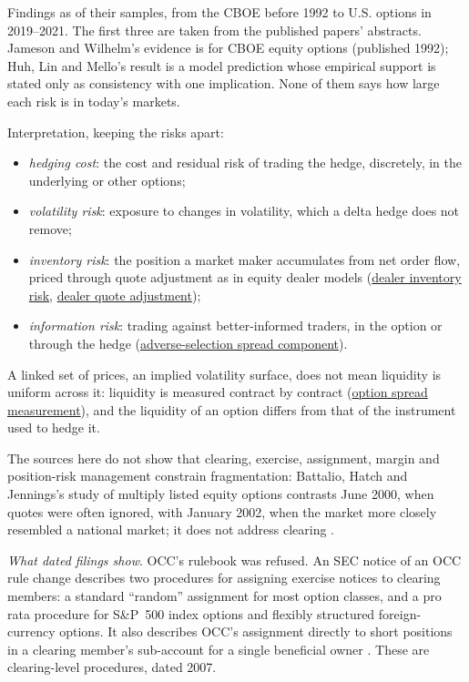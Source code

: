 \begin{qfresult}
 Findings as of their samples, from the CBOE before 1992 to U.S. options in 2019--2021. The first three are taken from the published papers' abstracts. Jameson and Wilhelm's evidence is for CBOE equity options (published 1992); Huh, Lin and Mello's result is a model prediction whose empirical support is stated only as consistency with one implication. None of them says how large each risk is in today's markets.

 Interpretation, keeping the risks apart:
\begin{itemize}
\item \emph{hedging cost}: the cost and residual risk of trading the hedge, discretely, in the underlying or other options;
\item \emph{volatility risk}: exposure to changes in volatility, which a delta hedge does not remove;
\item \emph{inventory risk}: the position a market maker accumulates from net order flow, priced through quote adjustment as in equity dealer models (\hyperref[def:dealer-inventory-risk]{dealer inventory risk}, \hyperref[meth:dealer-quote-adjustment]{dealer quote adjustment});
\item \emph{information risk}: trading against better-informed traders, in the option or through the hedge (\hyperref[res:adverse-selection-spread-component]{adverse-selection spread component}).
\end{itemize}
A linked set of prices, an implied volatility surface, does not mean liquidity is uniform across it: liquidity is measured contract by contract (\hyperref[meth:option-spread-measurement]{option spread measurement}), and the liquidity of an option differs from that of the instrument used to hedge it.

 The sources here do not show that clearing, exercise, assignment, margin and position-risk management constrain fragmentation: Battalio, Hatch and Jennings's study of multiply listed equity options contrasts June 2000, when quotes were often ignored, with January 2002, when the market more closely resembled a national market; it does not address clearing \citep[abstract]{ex-battalio-hatch-jennings-2004}.

\emph{What dated filings show}. OCC's rulebook was refused. An SEC notice of an OCC rule change describes two procedures for assigning exercise notices to clearing members: a standard ``random'' assignment for most option classes, and a pro rata procedure for S\&P~500 index options and flexibly structured foreign-currency options. It also describes OCC's assignment directly to short positions in a clearing member's sub-account for a single beneficial owner \citep[Release 34-56845, 27 November 2007, 72~FR 67991, 3 December 2007, sec.~II(A)]{fr-occ-2007-assignment}. These are clearing-level procedures, dated 2007.


\end{qfresult}
